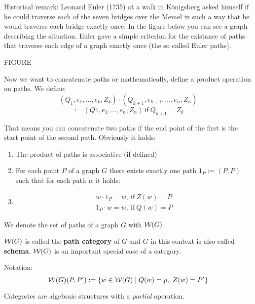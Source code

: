 Historical remark: Leonard Euler (1735) at a walk in Königsberg asked himself if
he could traverse each of the seven bridges over the Memel in such
a way that he would traverse each bridge exactly once. In the figure below you
can see a graph describing the situation. Euler gave a simple criterion for the
existance of paths that traverse each edge of a graph exactly once (the so
called Euler paths).

FIGURE

Now we want to concatenate paths or mathematically, define a product operation
on paths. We define:
\[ (Q_1, e_1, \ldots, e_k, Z_k) \cdot (Q_{k+1}, e_{k+1}, \ldots, e_n, Z_n) \]
\[:= (Q1,e_1, \ldots, e_n, Z_n)\ \mbox{if}\ Q_{k+1} = Z_k \]

That means you can concatenate two paths if the end point of the first is the
start point of the second path. Obviously it holds:

\begin{enumerate}
  \item The product of paths is associative (if defined)
  \item For each point $P$ of a graph $G$ there exists exactly one path $1_P :=
  (P, P)$ such that for each path $w$ it holds:
  \item
  	\begin{eqnarray*}
    	w \cdot 1_P = w,\ \mbox{if}\ Z(w) = P \\
    	1_P \cdot w = w,\ \mbox{if}\ Q(w) = P
  	\end{eqnarray*}
\end{enumerate}

We denote the set of paths of a graph $G$ with $\mbox{$\mathcal{W}(G)$}$.

$\mbox{$\mathcal{W}(G)$}$ is called the {\bf path category} of $G$ and $G$ in this
context is also called {\bf schema}. $\mbox{$\mathcal{W}(G)$}$ is an important
special case of a category.

Notation: 
\[ \mbox{$\mathcal{W}(G)$}(P,P') := \{ w \in \mbox{$\mathcal{W}(G)$} \mid Q(w) = p,\ Z(w) = P' \} \]

Categories are algebraic structures with a {\em partial} operation.

